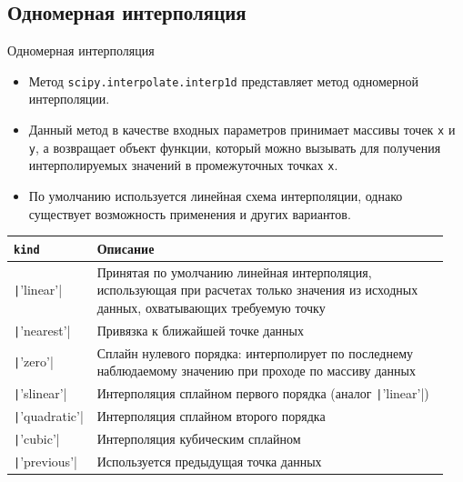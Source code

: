 \documentclass[aspectratio=169, mathserif]{beamer}	%
\begin{document}
\subsection{Одномерная интерполяция}
\begin{frame}[fragile, label=c]{Одномерная интерполяция}
\scriptsize
\begin{itemize}
	\item Метод \texttt{scipy.interpolate.interp1d} представляет метод одномерной интерполяции.
	\item Данный метод в качестве входных параметров принимает массивы точек \texttt{x} и \texttt{y}, а возвращает объект функции, который можно вызывать для получения интерполируемых значений в промежуточных точках \texttt{x}.
	\item По умолчанию используется линейная схема интерполяции, однако существует возможность применения и других вариантов.
\end{itemize}
\vfill
\begin{table}[h!]
	\begin{tabular*}{\linewidth}{p{0.15\linewidth}p{0.8\linewidth}}
		\hline
		\textbf{\texttt{kind} }& \textbf{Описание} \\
		\hline
		\texttt|'linear'| & Принятая по умолчанию линейная интерполяция, использующая при расчетах только значения из исходных данных, охватывающих требуемую точку \\
		\texttt|'nearest'| & Привязка к ближайшей	 точке данных \\
		\texttt|'zero'| & Сплайн нулевого порядка: интерполирует по последнему наблюдаемому значению при проходе по массиву данных \\
		\texttt|'slinear'| & Интерполяция сплайном первого порядка (аналог \texttt|'linear'|) \\
		\texttt|'quadratic'| & Интерполяция сплайном второго порядка \\
		\texttt|'cubic'| & Интерполяция кубическим сплайном \\
		\texttt|'previous'| & Используется предыдущая точка данных \\
		\hline
	\end{tabular*}
\end{table}
\vfill
\end{frame}
\end{document}
